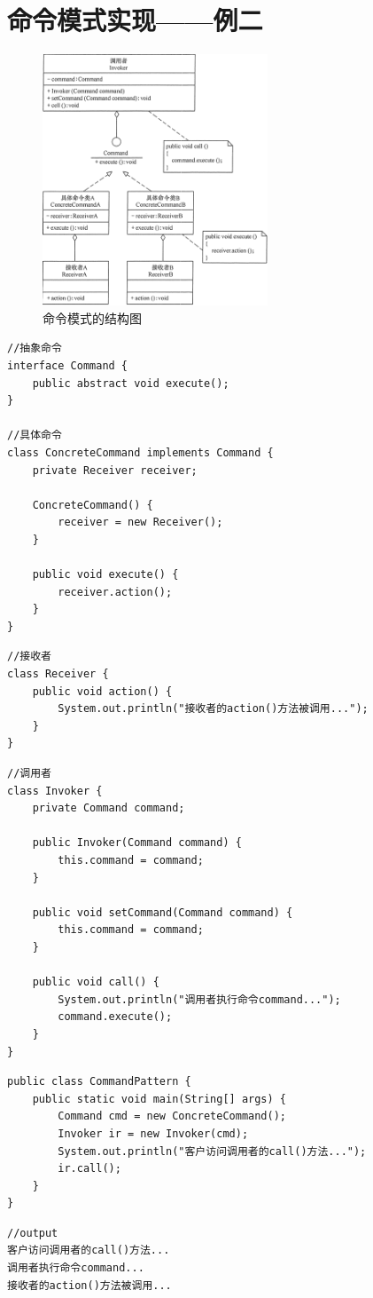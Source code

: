 \section{命令模式实现——例二}
\begin{figure}[!h]
	\centering
	\includegraphics[width=0.6\textwidth]{image/22-2}
	\caption{命令模式的结构图}
\end{figure}
\begin{lstlisting}
//抽象命令
interface Command {
	public abstract void execute();
}

//具体命令
class ConcreteCommand implements Command {
	private Receiver receiver;
	
	ConcreteCommand() {
		receiver = new Receiver();
	}
	
	public void execute() {
		receiver.action();
	}
}
\end{lstlisting}
\begin{lstlisting}
//接收者
class Receiver {
	public void action() {
		System.out.println("接收者的action()方法被调用...");
	}
}
\end{lstlisting}
\begin{lstlisting}
//调用者
class Invoker {
	private Command command;
	
	public Invoker(Command command) {
		this.command = command;
	}
	
	public void setCommand(Command command) {
		this.command = command;
	}
	
	public void call() {
		System.out.println("调用者执行命令command...");
		command.execute();
	}
}
\end{lstlisting}
\begin{lstlisting}
public class CommandPattern {
	public static void main(String[] args) {
		Command cmd = new ConcreteCommand();
		Invoker ir = new Invoker(cmd);
		System.out.println("客户访问调用者的call()方法...");
		ir.call();
	}
}
\end{lstlisting}
\begin{lstlisting}
//output
客户访问调用者的call()方法...
调用者执行命令command...
接收者的action()方法被调用...
\end{lstlisting}
